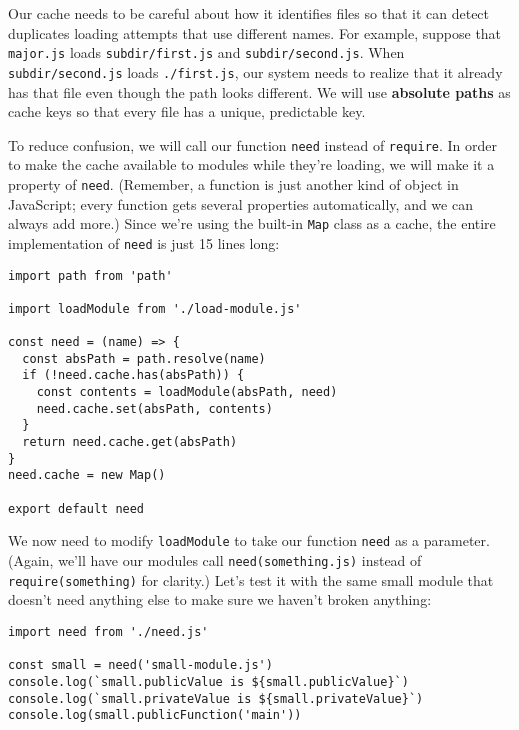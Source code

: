 \documentclass[krantzl]{krantz}
\newcommand{\glossref}[1]{\textbf{#1}}
\begin{document}
Our cache needs to be careful about how it identifies files
so that it can detect duplicates loading attempts that use different names.
For example,
suppose that \texttt{major.js} loads \texttt{subdir/first.js} and \texttt{subdir/second.js}.
When \texttt{subdir/second.js} loads \texttt{./first.js},
our system needs to realize that it already has that file
even though the path looks different.
We will use \glossref{absolute paths} as cache keys
so that every file has a unique, predictable key.


To reduce confusion,
we will call our function \texttt{need} instead of \texttt{require}.
In order to make the cache available to modules while they're loading,
we will make it a property of \texttt{need}.
(Remember,
a function is just another kind of object in JavaScript;
every function gets several properties automatically,
and we can always add more.)
Since we're using the built-in \texttt{Map} class as a cache,
the entire implementation of \texttt{need} is just 15 lines long:


\begin{lstlisting}[frame=single,frameround=tttt]
import path from 'path'

import loadModule from './load-module.js'

const need = (name) => {
  const absPath = path.resolve(name)
  if (!need.cache.has(absPath)) {
    const contents = loadModule(absPath, need)
    need.cache.set(absPath, contents)
  }
  return need.cache.get(absPath)
}
need.cache = new Map()

export default need
\end{lstlisting}



We now need to modify \texttt{loadModule} to take our function \texttt{need} as a parameter.
(Again, we'll have our modules call \texttt{need({\textquotesingle}something.js{\textquotesingle})} instead of \texttt{require({\textquotesingle}something{\textquotesingle})} for clarity.)
Let's test it with the same small module that doesn't need anything else to make sure we haven't broken anything:


\begin{lstlisting}[frame=single,frameround=tttt]
import need from './need.js'

const small = need('small-module.js')
console.log(`small.publicValue is ${small.publicValue}`)
console.log(`small.privateValue is ${small.privateValue}`)
console.log(small.publicFunction('main'))
\end{lstlisting}
\end{document}
